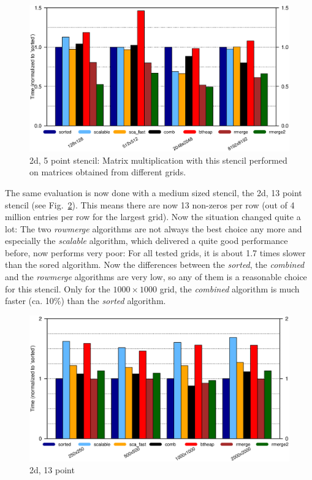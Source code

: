 \begin{figure}[tbp]
	\centering
	\hspace*{-7mm}\includegraphics[width=1.05\textwidth, trim={0 6.9cm 0 1cm},clip]{seq_2d5point}
	\caption{2d, 5 point stencil: Matrix multiplication with this stencil performed on matrices obtained from different grids.} 
	\label{fig:seq2d5point}
\end{figure}

The same evaluation is now done with a medium sized stencil, the 2d, 13 point stencil (see Fig.~\ref{fig:seq2d13point}). This means there are now 13 non-zeros per row (out of 4 million entries per row for the largest grid). Now the situation changed quite a lot: The two \textit{rowmerge} algorithms are not always the best choice any more and especially the \textit{scalable} algorithm, which delivered a quite good performance before, now performs very poor: For all tested grids, it is about 1.7 times slower than the sored algorithm. Now the differences between the \textit{sorted}, the \textit{combined} and the \textit{rowmerge} algorithms are very low, so any of them is a reasonable choice for this stencil. Only for the $1000 \times 1000$ grid, the \textit{combined} algorithm is much faster (ca. 10\%) than the \textit{sorted} algorithm.

\begin{figure}[tbp]
	\centering
	\includegraphics[width=1.1\textwidth, trim={0 7.3cm 0 1cm},clip]{seq_2d13point}
	\caption{2d, 13 point} 
	\label{fig:seq2d13point}
\end{figure}


